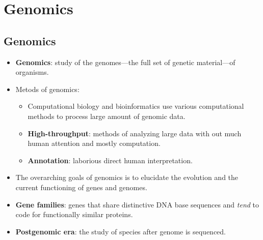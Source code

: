 \documentclass[12pt,a4paper]{article}
\begin{document}
\section{Genomics}
\subsection{Genomics}
\begin{itemize}
    \item \textbf{Genomics}: study of the genomes---the full set of genetic material---of organisms.
    \item Metods of genomics:
        \begin{itemize}
            \item Computational biology and bioinformatics use various computational methods to process large amount of genomic data.
            \item \textbf{High-throughput}: methods of analyzing large data with out much human attention and mostly computation.
            \item \textbf{Annotation}: laborious direct human interpretation.
        \end{itemize}
    \item The {\color{o-Sun}overarching goals} of genomics is to elucidate the {\color{o-Sun}evolution} and the {\color{o-Sun}current functioning} of genes and genomes.
    \item \textbf{Gene families}: genes that share distinctive DNA base sequences and \textit{tend} to code for functionally similar proteins.
    \item \textbf{Postgenomic era}: the study of species after genome is sequenced.
\end{itemize}
\end{document}
